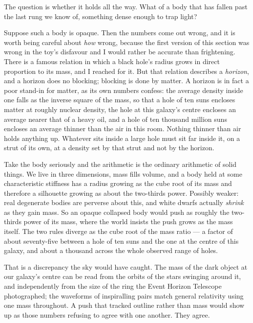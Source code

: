 The question is whether it holds all the way. What of a body that has fallen past the last rung we know of, something dense enough to trap light?

Suppose such a body is opaque. Then the numbers come out wrong, and it is worth being careful about \emph{how} wrong, because the first version of this section was wrong in the toy's disfavour and I would rather be accurate than frightening. There is a famous relation in which a black hole's radius grows in direct proportion to its mass, and I reached for it. But that relation describes a \emph{horizon}, and a horizon does no blocking; blocking is done by matter. A horizon is in fact a poor stand-in for matter, as its own numbers confess: the average density inside one falls as the inverse square of the mass, so that a hole of ten suns encloses matter at roughly nuclear density, the hole at this galaxy's centre encloses an average nearer that of a heavy oil, and a hole of ten thousand million suns encloses an average thinner than the air in this room. Nothing thinner than air holds anything up. Whatever sits inside a large hole must sit far inside it, on a strut of its own, at a density set by that strut and not by the horizon.

Take the body seriously and the arithmetic is the ordinary arithmetic of solid things. We live in three dimensions, mass fills volume, and a body held at some characteristic stiffness has a radius growing as the cube root of its mass and therefore a silhouette growing as about the two-thirds power. Possibly weaker: real degenerate bodies are perverse about this, and white dwarfs actually \emph{shrink} as they gain mass. So an opaque collapsed body would push as roughly the two-thirds power of its mass, where the world insists the push grows as the mass itself. The two rules diverge as the cube root of the mass ratio --- a factor of about seventy-five between a hole of ten suns and the one at the centre of this galaxy, and about a thousand across the whole observed range of holes.

That is a discrepancy the sky would have caught. The mass of the dark object at our galaxy's centre can be read from the orbits of the stars swinging around it, and independently from the size of the ring the Event Horizon Telescope photographed; the waveforms of inspiralling pairs match general relativity using one mass throughout. A push that tracked outline rather than mass would show up as those numbers refusing to agree with one another. They agree.

